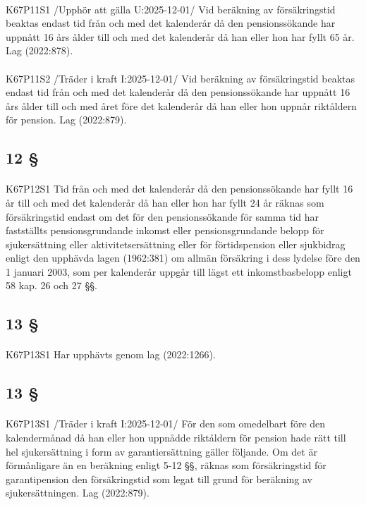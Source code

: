 \documentclass[a4paper,notitlepage,openany,10pt]{book}
\begin{document}
\paragraph*{}
{\tiny K67P11S1}
/Upphör att gälla U:2025-12-01/
Vid beräkning av försäkringstid beaktas endast tid från och med det kalenderår då den pensionssökande har uppnått 16 års ålder till och med det kalenderår då han eller hon har fyllt 65 år.
Lag (2022:878).
\paragraph*{}
{\tiny K67P11S2}
/Träder i kraft I:2025-12-01/
Vid beräkning av försäkringstid beaktas endast tid från och med det kalenderår då den pensionssökande har uppnått 16 års ålder till och med året före det kalenderår då han eller hon uppnår riktåldern för pension.
Lag (2022:879).
\subsection*{12 §}
\paragraph*{}
{\tiny K67P12S1}
Tid från och med det kalenderår då den pensionssökande har fyllt 16 år till och med det kalenderår då han eller hon har fyllt 24 år räknas som försäkringstid endast om det för den pensionssökande för samma tid har fastställts pensionsgrundande inkomst eller pensionsgrundande belopp för sjukersättning eller aktivitetsersättning eller för förtidspension eller sjukbidrag enligt den upphävda lagen (1962:381) om allmän försäkring i dess lydelse före den 1 januari 2003, som per kalenderår uppgår till lägst ett inkomstbasbelopp enligt 58 kap. 26 och 27 §§.
\subsection*{13 §}
\paragraph*{}
{\tiny K67P13S1}
Har upphävts genom
lag (2022:1266).
\subsection*{13 §}
\paragraph*{}
{\tiny K67P13S1}
/Träder i kraft I:2025-12-01/
För den som omedelbart före den kalendermånad då han eller hon uppnådde riktåldern för pension hade rätt till hel sjukersättning i form av garantiersättning gäller följande. Om det är förmånligare än en beräkning enligt 5-12 §§, räknas som försäkringstid för garantipension den försäkringstid som legat till grund för beräkning av sjukersättningen.
Lag (2022:879).
\end{document}
